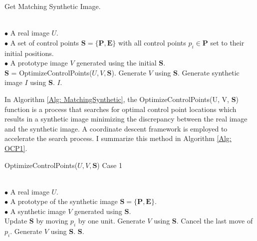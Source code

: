 \documentclass{iitthesis}
\begin{document}
{\linespread{1.5}
\begin{algorithm}[htb]  
\small
 	\caption{ Get Matching Synthetic Image.}   
	\label{Alg: MatchingSynthetic}    	
\begin{algorithmic}[1]  	\REQUIRE ~~\\ 		
$\bullet$ A real image $U$. \\ 	
	$\bullet$ A set of control points 
$\textbf{S}=\{\textbf{P}, \textbf{E}\}$ 
with all control points $p_i\in \textbf{P}$ set to their initial positions.\\ 	
	$\bullet$ A prototype image $V$ generated using the initial $\textbf{S}$.  \\ 	
		\STATE \textbf{S} = OptimizeControlPoints($U, V, \textbf{S}$). 		
	\STATE Generate $V$ using $\textbf{S}$. 		
\ENDWHILE 
		\STATE Generate synthetic image $I$ using \textbf{S}. 	
	\RETURN $I$. 	
\end{algorithmic} 
 \end{algorithm}  
}

In Algorithm \ref{Alg: MatchingSynthetic}, the OptimizeControlPoints(U, V, \textbf{S}) function is a process that searches for optimal control point locations which results in a synthetic image minimizing the discrepancy between the real image and the synthetic image. A coordinate descent framework is employed to accelerate the search process. I summarize this method in Algorithm \ref{Alg: OCP1}.

{\linespread{1.5}
\begin{algorithm}[htb]  
\small
 	\caption{ OptimizeControlPoints($U, V, \textbf{S}$) Case 1}   
	\label{Alg: OCP1}    
	\begin{algorithmic}[1]  		\REQUIRE ~~\\ 
		$\bullet$ A real image $U$. \\ 
		$\bullet$ A prototype of the synthetic image $\textbf{S}=\{\textbf{P}, \textbf{E}\}$.\\ 	
	$\bullet$ A synthetic image $V$ generated using $\textbf{S}$.  \\ 	
	 		\STATE Update $\textbf{S}$ by moving $p_i$ by one unit. 	
	\STATE Generate $V$ using \textbf{S}. 	
			\STATE Cancel the last move of $p_i$. 	
		\STATE Generate $V$ using \textbf{S}. 	
	\ENDIF 	
	\ENDFOR 	
	\RETURN \textbf{S}. 	
\end{algorithmic}   
\end{algorithm}  
}
\end{document}
